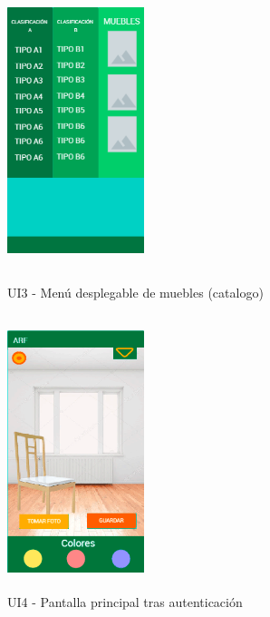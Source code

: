 \begin{figure}[h!]
	\begin{minipage}{0.48\textwidth}
		\centering
		\includegraphics[width=4cm,height=8cm]{imagenes/Anexos/Mockup/3-MenuMuebles.PNG}
		\caption{UI3 - Menú desplegable de muebles (catalogo)}
		\label{fig:analogo}
	\end{minipage}\hfill
	\begin{minipage}{0.48\textwidth}
		\centering
		\includegraphics[width=4cm,height=8cm]{imagenes/Anexos/Mockup/4-principalLogin.png}
		\caption{UI4 - Pantalla principal tras autenticación}
		\label{fig:analogo}
	\end{minipage}\hfill
\end{figure}

